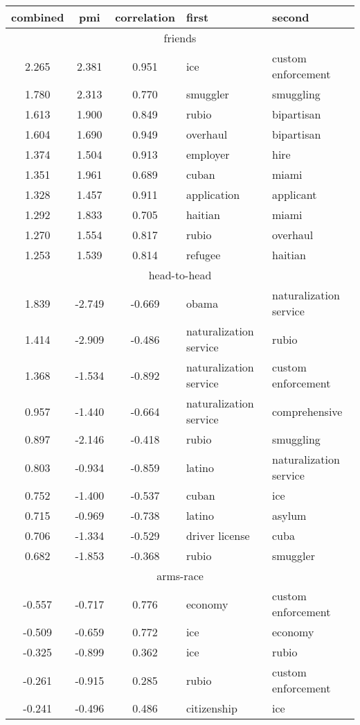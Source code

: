 \begin{tabular}{cccp{5cm}p{5cm}}
\toprule
combined & pmi & correlation & first & second\\
\midrule
\multicolumn{5}{c}{friends}\\
2.265 & 2.381 & 0.951 & ice & custom enforcement \\
1.780 & 2.313 & 0.770 & smuggler & smuggling \\
1.613 & 1.900 & 0.849 & rubio & bipartisan \\
1.604 & 1.690 & 0.949 & overhaul & bipartisan \\
1.374 & 1.504 & 0.913 & employer & hire \\
1.351 & 1.961 & 0.689 & cuban & miami \\
1.328 & 1.457 & 0.911 & application & applicant \\
1.292 & 1.833 & 0.705 & haitian & miami \\
1.270 & 1.554 & 0.817 & rubio & overhaul \\
1.253 & 1.539 & 0.814 & refugee & haitian \\
\midrule
\multicolumn{5}{c}{head-to-head}\\
1.839 & -2.749 & -0.669 & obama & naturalization service \\
1.414 & -2.909 & -0.486 & naturalization service & rubio \\
1.368 & -1.534 & -0.892 & naturalization service & custom enforcement \\
0.957 & -1.440 & -0.664 & naturalization service & comprehensive \\
0.897 & -2.146 & -0.418 & rubio & smuggling \\
0.803 & -0.934 & -0.859 & latino & naturalization service \\
0.752 & -1.400 & -0.537 & cuban & ice \\
0.715 & -0.969 & -0.738 & latino & asylum \\
0.706 & -1.334 & -0.529 & driver license & cuba \\
0.682 & -1.853 & -0.368 & rubio & smuggler \\
\midrule
\multicolumn{5}{c}{arms-race}\\
-0.557 & -0.717 & 0.776 & economy & custom enforcement \\
-0.509 & -0.659 & 0.772 & ice & economy \\
-0.325 & -0.899 & 0.362 & ice & rubio \\
-0.261 & -0.915 & 0.285 & rubio & custom enforcement \\
-0.241 & -0.496 & 0.486 & citizenship & ice \\

\end{tabular}
